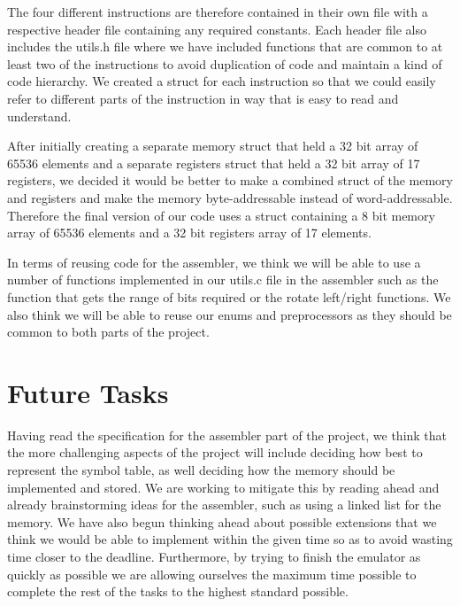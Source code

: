 \documentclass[11pt]{article}
\begin{document}
The four different instructions are therefore contained in their own file with a respective header file containing any required constants. Each header file also includes the utils.h file where we have included functions that are common to at least two of the instructions to avoid duplication of code and maintain a kind of code hierarchy. We created a struct for each instruction so that we could easily refer to different parts of the instruction in way that is easy to read and understand.

After initially creating a separate memory struct that held a 32 bit array of 65536 elements and a separate registers struct that held a 32 bit array of 17 registers, we decided it would be better to make a combined struct of the memory and registers and make the memory byte-addressable instead of word-addressable. Therefore the final version of our code uses a struct containing a 8 bit memory array of 65536 elements and a 32 bit registers array of 17 elements.

In terms of reusing code for the assembler, we think we will be able to use a number of functions implemented in our utils.c file in the assembler such as the function that gets the range of bits required or the rotate left/right functions. We also think we will be able to reuse our enums and preprocessors as they should be common to both parts of the project.

\section{Future Tasks}

Having read the specification for the assembler part of the project, we think that the more challenging aspects of the project will include deciding how best to represent the symbol table, as well deciding how the memory should be implemented and stored. We are working to mitigate this by reading ahead and already brainstorming ideas for the assembler, such as using a linked list for the memory. We have also begun thinking ahead about possible extensions that we think we would be able to implement within the given time so as to avoid wasting time closer to the deadline. Furthermore, by trying to finish the emulator as quickly as possible we are allowing ourselves the maximum time possible to complete the rest of the tasks to the highest standard possible.
\end{document}
